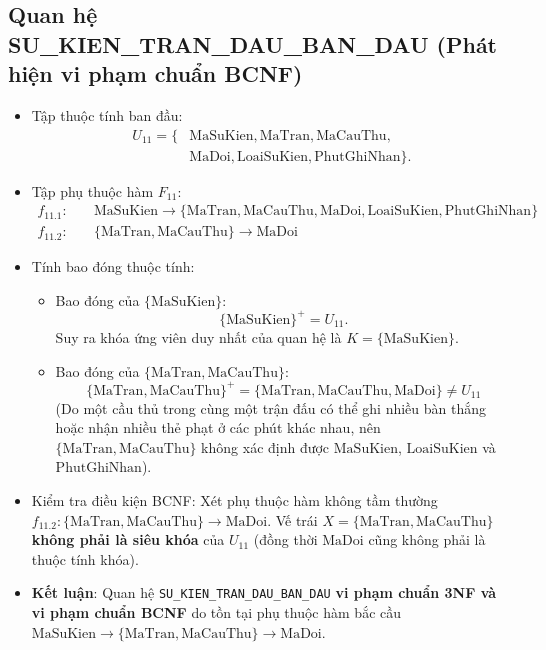 \subsection{Quan hệ SU\_KIEN\_TRAN\_DAU\_BAN\_DAU (Phát hiện vi phạm chuẩn BCNF)}
\begin{itemize}
    \item Tập thuộc tính ban đầu:
    \begin{align*}
        U_{11} = \{&\text{MaSuKien}, \text{MaTran}, \text{MaCauThu}, \\
                   &\text{MaDoi}, \text{LoaiSuKien}, \text{PhutGhiNhan}\}.
    \end{align*}
    \item Tập phụ thuộc hàm $F_{11}$:
    \begin{align*}
        f_{11.1}: & \quad \text{MaSuKien} \rightarrow \{\text{MaTran}, \text{MaCauThu}, \text{MaDoi}, \text{LoaiSuKien}, \text{PhutGhiNhan}\} \\
        f_{11.2}: & \quad \{\text{MaTran}, \text{MaCauThu}\} \rightarrow \text{MaDoi}
    \end{align*}
    \item Tính bao đóng thuộc tính:
    \begin{itemize}
        \item Bao đóng của $\{\text{MaSuKien}\}$:
        $$\{\text{MaSuKien}\}^+ = U_{11}.$$
        Suy ra khóa ứng viên duy nhất của quan hệ là $K = \{\text{MaSuKien}\}$.
        \item Bao đóng của $\{\text{MaTran}, \text{MaCauThu}\}$:
        $$\{\text{MaTran}, \text{MaCauThu}\}^+ = \{\text{MaTran}, \text{MaCauThu}, \text{MaDoi}\} \neq U_{11}$$
        (Do một cầu thủ trong cùng một trận đấu có thể ghi nhiều bàn thắng hoặc nhận nhiều thẻ phạt ở các phút khác nhau, nên $\{\text{MaTran}, \text{MaCauThu}\}$ không xác định được $\text{MaSuKien}$, $\text{LoaiSuKien}$ và $\text{PhutGhiNhan}$).
    \end{itemize}
    \item Kiểm tra điều kiện BCNF:
    Xét phụ thuộc hàm không tầm thường $f_{11.2}: \{\text{MaTran}, \text{MaCauThu}\} \rightarrow \text{MaDoi}$. Vế trái $X = \{\text{MaTran}, \text{MaCauThu}\}$ \textbf{không phải là siêu khóa} của $U_{11}$ (đồng thời $\text{MaDoi}$ cũng không phải là thuộc tính khóa).
    \item \textbf{Kết luận}: Quan hệ \texttt{SU\_KIEN\_TRAN\_DAU\_BAN\_DAU} \textbf{vi phạm chuẩn 3NF và vi phạm chuẩn BCNF} do tồn tại phụ thuộc hàm bắc cầu $\text{MaSuKien} \rightarrow \{\text{MaTran}, \text{MaCauThu}\} \rightarrow \text{MaDoi}$.
\end{itemize}

